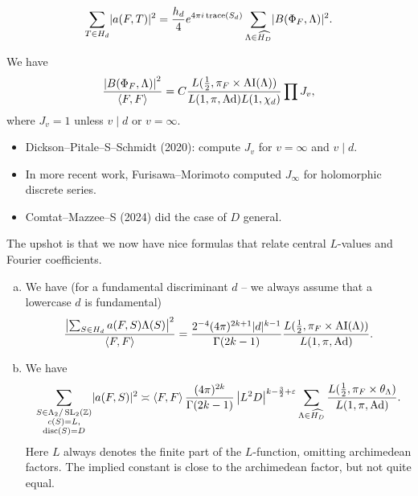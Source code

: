 \documentclass[reqno]{amsart} 
\begin{document}
\begin{equation*}
  \sum_{T \in H_d } \lvert a(F, T) \rvert^2 = \frac{h_d}{4} e^{4 \pi i \operatorname{trace}(S_d)}
\sum_{\Lambda \in \widehat{H_D }} \lvert B(\Phi_F, \Lambda ) \rvert^2.  
\end{equation*}

\begin{theorem}\label{theorem:cnfg5jymlf}
  We have
  \begin{equation*}
    \frac{\left\lvert B(\Phi_F, \Lambda ) \right\rvert^2 }{ \left\langle F, F \right\rangle}
    = C \frac{L(\tfrac{1}{2}, \pi_F \times \operatorname{AI}(\Lambda))}{L(1, \pi, \operatorname{Ad}) L(1, \chi_d)} \prod J_v,    
  \end{equation*}
  where $J_v = 1$ unless $v \mid d$ or $v = \infty$.
\end{theorem}

\begin{itemize}
\item Dickson--Pitale--S--Schmidt (2020): compute $J_v$ for $v = \infty$ and $v \mid d$.
\item In more recent work, Furisawa--Morimoto computed $J_\infty$ for holomorphic discrete series.
\item Comtat--Mazzee--S (2024) did the case of $D$ general.
\end{itemize}
The upshot is that we now have nice formulas that relate central $L$-values and Fourier coefficients.
\begin{enumerate}[(a)]
\item We have (for a fundamental discriminant $d$ -- we always assume that a lowercase $d$ is fundamental)
  \begin{equation*}
    \frac{\left\lvert \sum_{S \in H_d} a(F, S) \Lambda(S) \right\rvert^2 }{\left\langle F, F \right\rangle} = \frac{2^{- 4}(4 \pi )^{2 k + 1} \lvert d \rvert^{k - 1}}{\Gamma(2 k - 1)} \frac{L(\tfrac{1}{2}, \pi_F \times \operatorname{AI}(\Lambda))}{L(1, \pi, \operatorname{Ad})}.
  \end{equation*}
\item We have
  \begin{equation*}
    \sum_{
      \substack{
        S \in \Lambda_2 / \operatorname{SL}_2(\mathbb{Z})  \\
        c(S) = L,  \\ \operatorname{disc}(S) = D        
      }
    }
    \lvert a(F, S) \rvert^2 \asymp \left\langle F, F \right\rangle
    \frac{(4 \pi )^{2 k }}{\Gamma(2 k - 1)}
    \left\lvert L^2 D \right\rvert^{k - \frac{3}{2} + \varepsilon }
    \sum_{\Lambda \in \widehat{H_D}} \frac{L(\tfrac{1}{2}, \pi_F \times \theta_\Lambda)}{L(1, \pi, \operatorname{Ad})}.
  \end{equation*}
  Here $L$ always denotes the finite part of the $L$-function, omitting archimedean factors.  The implied constant is close to the archimedean factor, but not quite equal.
\end{enumerate}
\end{document}
